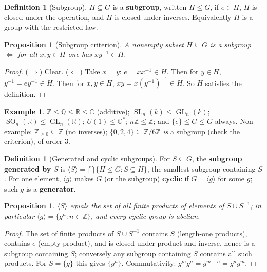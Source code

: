 \documentclass[11pt,a4paper]{article}
\newtheorem{proposition}[theorem]{Proposition}
\theoremstyle{definition}
\newtheorem{definition}[theorem]{Definition}
\newtheorem{example}[theorem]{Example}
\newcommand{\Z}{\mathbb{Z}}
\newcommand{\Q}{\mathbb{Q}}
\newcommand{\R}{\mathbb{R}}
\newcommand{\C}{\mathbb{C}}
\newcommand{\GL}{\operatorname{GL}}
\newcommand{\SL}{\operatorname{SL}}
\newcommand{\SO}{\operatorname{SO}}
\begin{document}
	\begin{definition}[Subgroup]
		$H\subseteq G$ is a \textbf{subgroup}, written $H\le G$, if $e\in H$, $H$ is closed under the
		operation, and $H$ is closed under inverses. Equivalently $H$ is a group with the restricted law.
	\end{definition}
	
	\begin{proposition}[Subgroup criterion]\label{prop:subgroup}
		A nonempty subset $H\subseteq G$ is a subgroup $\iff$ for all $x,y\in H$ one has $xy^{-1}\in H$.
	\end{proposition}
	\begin{proof}
		($\Rightarrow$) Clear. ($\Leftarrow$) Take $x=y$: $e=xx^{-1}\in H$. Then for $y\in H$,
		$y^{-1}=ey^{-1}\in H$. Then for $x,y\in H$, $xy=x(y^{-1})^{-1}\in H$. So $H$ satisfies the definition.
	\end{proof}
	
	\begin{example}
		$\Z\le\Q\le\R\le\C$ (additive); $\SL_n(k)\le\GL_n(k)$; $\SO_n(\R)\le\GL_n(\R)$; $U(1)\le\C^*$;
		$n\Z\le\Z$; and $\{e\}\le G\le G$ always. Non-example: $\Z_{\ge0}\subseteq\Z$ (no inverses);
		$\{0,2,4\}\subseteq\Z/6\Z$ \emph{is} a subgroup (check the criterion), of order $3$.
	\end{example}
	
	\begin{definition}[Generated and cyclic subgroups]
		For $S\subseteq G$, the \textbf{subgroup generated by $S$} is
		$\langle S\rangle=\bigcap\{H\le G:S\subseteq H\}$, the smallest subgroup containing $S$.
		For one element, $\langle g\rangle$ makes $G$ (or the subgroup) \textbf{cyclic} if $G=\langle g\rangle$
		for some $g$; such $g$ is a \textbf{generator}.
	\end{definition}
	
	\begin{proposition}\label{prop:generated}
		$\langle S\rangle$ equals the set of all finite products of elements of $S\cup S^{-1}$; in particular
		$\langle g\rangle=\{g^n:n\in\Z\}$, and every cyclic group is abelian.
	\end{proposition}
	\begin{proof}
		The set of finite products of $S\cup S^{-1}$ contains $S$ (length-one products), contains $e$ (empty
		product), and is closed under product and inverse, hence is a subgroup containing $S$; conversely any
		subgroup containing $S$ contains all such products. For $S=\{g\}$ this gives $\{g^n\}$. Commutativity:
		$g^mg^n=g^{m+n}=g^ng^m$.
	\end{proof}
	
\end{document}
